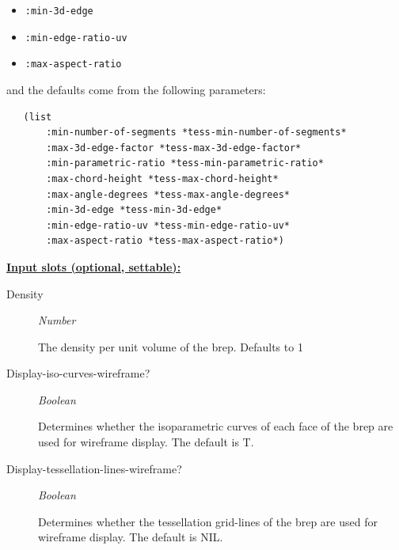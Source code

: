 \documentclass [11pt]{book}
\begin{document}
\begin{itemize}
\begin{description}
\begin{itemize}
\item \texttt{:min-3d-edge}


\item \texttt{:min-edge-ratio-uv}


\item \texttt{:max-aspect-ratio}


\end{itemize}


and the defaults come from the following parameters:


\begin{verbatim}
   (list 
       :min-number-of-segments *tess-min-number-of-segments*
       :max-3d-edge-factor *tess-max-3d-edge-factor*
       :min-parametric-ratio *tess-min-parametric-ratio*
       :max-chord-height *tess-max-chord-height*
       :max-angle-degrees *tess-max-angle-degrees*
       :min-3d-edge *tess-min-3d-edge*
       :min-edge-ratio-uv *tess-min-edge-ratio-uv*
       :max-aspect-ratio *tess-max-aspect-ratio*)

\end{verbatim}



\end{description}






\textbf{
\underline{Input slots (optional, settable):}}

\begin{description}

\item [Density]
\emph{Number}

 The density per unit volume of the brep. Defaults to 1




\item [Display-iso-curves-wireframe?]
\emph{Boolean}

 Determines whether the isoparametric curves of each face of the brep are used for wireframe display.
The default is T.




\item [Display-tessellation-lines-wireframe?]
\emph{Boolean}

 Determines whether the tessellation grid-lines of the brep are used for wireframe display.
The default is NIL.





\end{description}
\end{itemize}
\end{document}
